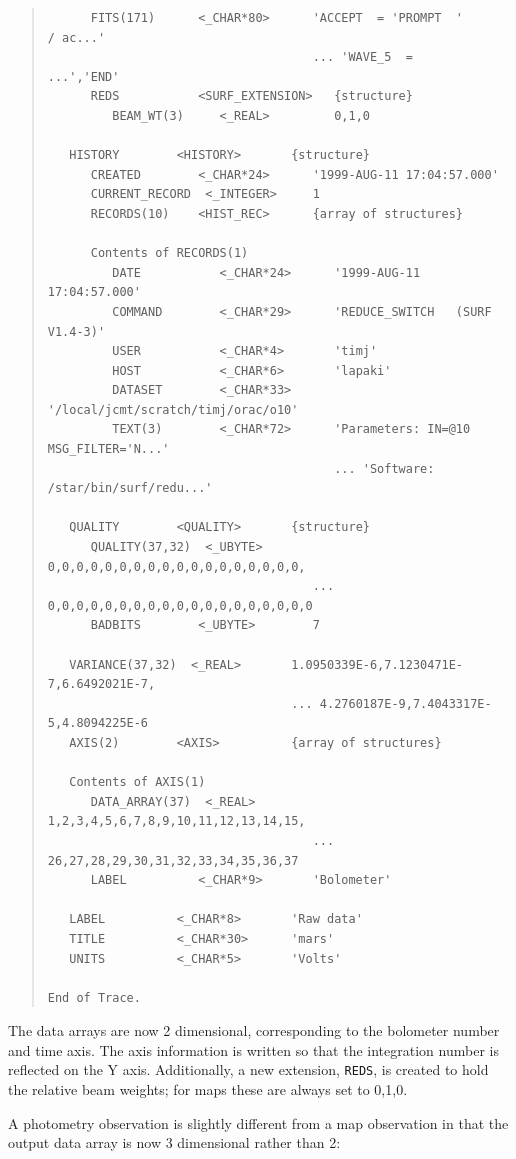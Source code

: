 \documentclass[twoside,11pt]{article}
\newenvironment{myquote}{\begin{quote}\begin{small}}{\end{small}\end{quote}}
\renewcommand{\_}{\texttt{\symbol{95}}}
\begin{document}
\begin{myquote}
\begin{verbatim}
      FITS(171)      <_CHAR*80>      'ACCEPT  = 'PROMPT  '           / ac...'
                                     ... 'WAVE_5  =                 ...','END'
      REDS           <SURF_EXTENSION>   {structure}
         BEAM_WT(3)     <_REAL>         0,1,0

   HISTORY        <HISTORY>       {structure}
      CREATED        <_CHAR*24>      '1999-AUG-11 17:04:57.000'
      CURRENT_RECORD  <_INTEGER>     1
      RECORDS(10)    <HIST_REC>      {array of structures}

      Contents of RECORDS(1)
         DATE           <_CHAR*24>      '1999-AUG-11 17:04:57.000'
         COMMAND        <_CHAR*29>      'REDUCE_SWITCH   (SURF V1.4-3)'
         USER           <_CHAR*4>       'timj'
         HOST           <_CHAR*6>       'lapaki'
         DATASET        <_CHAR*33>      '/local/jcmt/scratch/timj/orac/o10'
         TEXT(3)        <_CHAR*72>      'Parameters: IN=@10 MSG_FILTER='N...'
                                        ... 'Software: /star/bin/surf/redu...'

   QUALITY        <QUALITY>       {structure}
      QUALITY(37,32)  <_UBYTE>       0,0,0,0,0,0,0,0,0,0,0,0,0,0,0,0,0,0,
                                     ... 0,0,0,0,0,0,0,0,0,0,0,0,0,0,0,0,0,0,0
      BADBITS        <_UBYTE>        7

   VARIANCE(37,32)  <_REAL>       1.0950339E-6,7.1230471E-7,6.6492021E-7,
                                  ... 4.2760187E-9,7.4043317E-5,4.8094225E-6
   AXIS(2)        <AXIS>          {array of structures}

   Contents of AXIS(1)
      DATA_ARRAY(37)  <_REAL>        1,2,3,4,5,6,7,8,9,10,11,12,13,14,15,
                                     ... 26,27,28,29,30,31,32,33,34,35,36,37
      LABEL          <_CHAR*9>       'Bolometer'

   LABEL          <_CHAR*8>       'Raw data'
   TITLE          <_CHAR*30>      'mars'
   UNITS          <_CHAR*5>       'Volts'

End of Trace.
\end{verbatim}
\end{myquote}

The data arrays are now 2 dimensional, corresponding to the bolometer number
and time axis. The axis information is written so that the integration number
is reflected on the Y axis. Additionally, a new extension, \texttt{REDS}, is
created to hold the relative beam weights; for maps these are always set to 0,1,0.

A photometry observation is slightly different from a map observation in that
the output data array is now 3 dimensional rather than 2:
\end{document}
